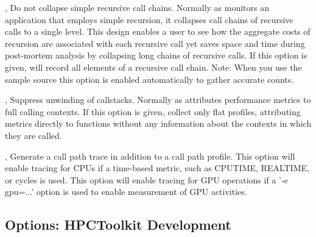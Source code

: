 \documentclass[english]{article}
\begin{document}
\begin{Description}
 \item[\Opt{-r}, \Opt{--retain-recursion}]
Do not collapse simple recursive call chains.
Normally as  monitors an application that employs simple recursion, it collapses call chains of recursive calls to a single level. 
This design enables a user to see how the aggregate costs of recursion are associated with each recursive call yet
saves space and time during post-mortem analysis by collapsing long chains of recursive calls.
If this option is given,  will record all elements of a recursive call chain.
Note: When you use the  sample source this option is enabled automatically
to gather accurate counts.

 \item[\Opt{-nu}, \Opt{--no-unwind}]
Suppress unwinding of callstacks.
Normally as  attributes performance metrics to full calling contexts. 
If this option is given,  collect only flat profiles, attributing 
metrics directly to functions without any information about the contexts in which they are called.

\item[\Opt{-t}, \Opt{--trace}]
Generate a call path trace in addition to a call path profile. 
This option will enable tracing for CPUs if a time-based metric, such as CPUTIME, REALTIME, or cycles is used. 
This option will enable tracing for GPU operations if a '-e gpu=...' option is used to enable 
measurement of GPU activities.

\end{Description}

\subsection{Options: HPCToolkit Development}
\end{document}
